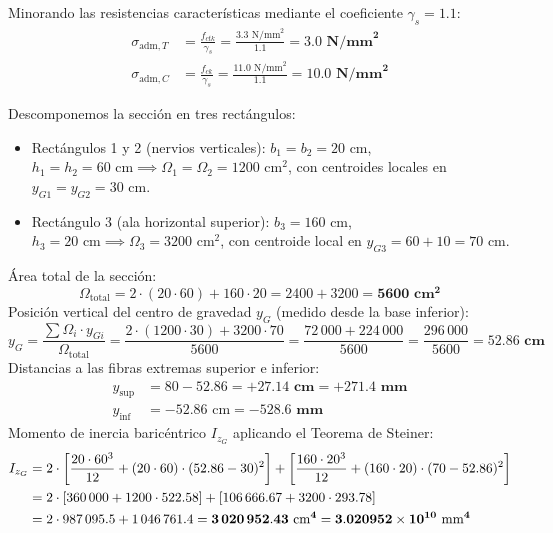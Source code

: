 {    \tcblower


    Minorando las resistencias características mediante el coeficiente $\gamma_s = 1.1$:
    \begin{align}
        \sigma_{\text{adm},T} & = \frac{f_{ctk}}{\gamma_s} = \frac{3.3\text{ N/mm}^2}{1.1} = \mathbf{3.0\text{ N/mm}^2} \\
        \sigma_{\text{adm},C} & = \frac{f_{ck}}{\gamma_s} = \frac{11.0\text{ N/mm}^2}{1.1} = \mathbf{10.0\text{ N/mm}^2}
    \end{align}


    Descomponemos la sección en tres rectángulos:
    \begin{itemize}
        \item Rectángulos 1 y 2 (nervios verticales): $b_1 = b_2 = 20\text{ cm}$, $h_1 = h_2 = 60\text{ cm} \implies \Omega_1 = \Omega_2 = 1200\text{ cm}^2$, con centroides locales en $y_{G1} = y_{G2} = 30\text{ cm}$.
        \item Rectángulo 3 (ala horizontal superior): $b_3 = 160\text{ cm}$, $h_3 = 20\text{ cm} \implies \Omega_3 = 3200\text{ cm}^2$, con centroide local en $y_{G3} = 60 + 10 = 70\text{ cm}$.
    \end{itemize}
    Área total de la sección:
    \begin{equation}
        \Omega_{\text{total}} = 2 \cdot (20 \cdot 60) + 160 \cdot 20 = 2400 + 3200 = \mathbf{5600\text{ cm}^2}
    \end{equation}
    Posición vertical del centro de gravedad $y_G$ (medido desde la base inferior):
    \begin{equation}
        y_G = \frac{\sum \Omega_i \cdot y_{Gi}}{\Omega_{\text{total}}} = \frac{2 \cdot (1200 \cdot 30) + 3200 \cdot 70}{5600} = \frac{72\,000 + 224\,000}{5600} = \frac{296\,000}{5600} = \mathbf{52.86\text{ cm}}
    \end{equation}
    Distancias a las fibras extremas superior e inferior:
    \begin{align}
        y_{\text{sup}} & = 80 - 52.86 = \mathbf{+27.14\text{ cm}} = \mathbf{+271.4\text{ mm}} \\
        y_{\text{inf}} & = -52.86\text{ cm} = \mathbf{-528.6\text{ mm}}
    \end{align}
    Momento de inercia baricéntrico $I_{z_G}$ aplicando el Teorema de Steiner:
    \begin{align}
        I_{z_G} & = 2 \cdot \left[ \frac{20 \cdot 60^3}{12} + (20 \cdot 60) \cdot (52.86 - 30)^2 \right] + \left[ \frac{160 \cdot 20^3}{12} + (160 \cdot 20) \cdot (70 - 52.86)^2 \right] \notag \\
                & = 2 \cdot [360\,000 + 1200 \cdot 522.58] + [106\,666.67 + 3200 \cdot 293.78] \notag                                                                                      \\
                & = 2 \cdot 987\,095.5 + 1\,046\,761.4 = \mathbf{3\,020\,952.43\text{ cm}^4} = \mathbf{3.020952 \times 10^{10}\text{ mm}^4}
    \end{align}

}
